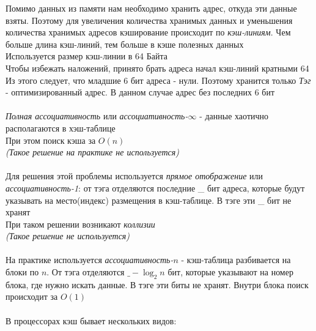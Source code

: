 \documentclass[12pt]{article}
\begin{document}
Помимо данных из памяти нам необходимо хранить адрес, откуда эти данные взяты. Поэтому для увеличения количества хранимых данных и уменьшения количества хранимых адресов кэширование происходит по \textit{кэш-линиям}. Чем больше длина кэш-линий, тем больше в кэше полезных данных\\
Используется размер кэш-линии в 64 Байта\\
Чтобы избежать наложений, принято брать адреса начал кэш-линий кратными 64\\
Из этого следует, что младшие 6 бит адреса - нули. Поэтому хранится только \textit{Тэг} - оптимизированный адрес. В данном случае адрес без последних 6 бит\\\\
\textit{Полная ассоциативность} или \textit{ассоциативность-$\infty$} - данные хаотично располагаются в хэш-таблице\\
При этом поиск кэша за $O(n)$\\
\textit{(Такое решение на практике не используется)}\\\\
Для решения этой проблемы используется \textit{прямое отображение} или \textit{ассоциативность-1}: от тэга отделяются последние \_ бит адреса, которые будут указывать на место(индекс) размещения в кэш-таблице. В тэге эти \_ бит не хранят\\
При таком решении возникают \textit{коллизии}\\
\textit{(Такое решение не используется)}\\\\
На практике используется \textit{ассоциативность-$n$} - кэш-таблица разбивается на блоки по $n$. От тэга отделяются $\_-\log_2 n$ бит, которые указывают на номер блока, где нужно искать данные. В тэге эти биты не хранят. Внутри блока поиск происходит за $O(1)$\\\\
В процессорах кэш бывает нескольких видов:
\end{document}
